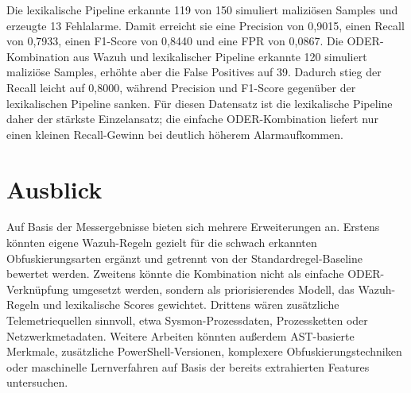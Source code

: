 \documentclass[12pt,a4paper,oneside,parskip=half]{scrreprt}
\begin{document}
Die lexikalische Pipeline erkannte 119 von 150 simuliert maliziösen Samples und erzeugte 13 Fehlalarme. Damit erreicht sie eine Precision von 0{,}9015, einen Recall von 0{,}7933, einen F1-Score von 0{,}8440 und eine FPR von 0{,}0867. Die ODER-Kombination aus Wazuh und lexikalischer Pipeline erkannte 120 simuliert maliziöse Samples, erhöhte aber die False Positives auf 39. Dadurch stieg der Recall leicht auf 0{,}8000, während Precision und F1-Score gegenüber der lexikalischen Pipeline sanken. Für diesen Datensatz ist die lexikalische Pipeline daher der stärkste Einzelansatz; die einfache ODER-Kombination liefert nur einen kleinen Recall-Gewinn bei deutlich höherem Alarmaufkommen.

\section{Ausblick}
Auf Basis der Messergebnisse bieten sich mehrere Erweiterungen an. Erstens könnten eigene Wazuh-Regeln gezielt für die schwach erkannten Obfuskierungsarten ergänzt und getrennt von der Standardregel-Baseline bewertet werden. Zweitens könnte die Kombination nicht als einfache ODER-Verknüpfung umgesetzt werden, sondern als priorisierendes Modell, das Wazuh-Regeln und lexikalische Scores gewichtet. Drittens wären zusätzliche Telemetriequellen sinnvoll, etwa Sysmon-Prozessdaten, Prozessketten oder Netzwerkmetadaten. Weitere Arbeiten könnten außerdem AST-basierte Merkmale, zusätzliche PowerShell-Versionen, komplexere Obfuskierungstechniken oder maschinelle Lernverfahren auf Basis der bereits extrahierten Features untersuchen.
\end{document}
